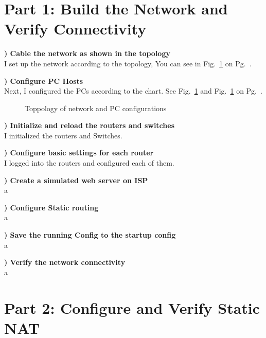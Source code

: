 \documentclass{report}
\title{\classinfo}
\author{\semester}
\date{\today}
\newcommand{\mysection}[1]{\section*{#1}}
\newcommand{\mysubsection}[2]{\textbf{\romannumeral #1) #2}}
\begin{document}
\maketitle

\mysection{\textbf{Part 1: Build the Network and Verify Connectivity}}

\mysubsection{1}{Cable the network as shown in the topology}\\
I set up the network according to the topology, You can see in
Fig.~\ref{P1Top20} on Pg.~\pageref{P1Top20}. 


\noindent\mysubsection{2}{Configure PC Hosts}\\
Next, I configured the PCs according to the chart. See
Fig.~\ref{P1Top20} and Fig.~\ref{P1Top20} on 
Pg.~\pageref{P1Top20}.


\begin{figure}[!hbt]\centering
{}\par
{}\hfill
{}\par
\caption{Toppology of network and PC configurations}
\label{P1Top20}
\end{figure}

\noindent\mysubsection{3}{Initialize and reload the routers and switches}\\
I initialized the routers and Switches.

\noindent\mysubsection{4}{Configure basic settings for each router}\\
I logged into the routers and configured each of them.

\noindent\mysubsection{5}{Create a simulated web server on ISP}\\
a

\noindent\mysubsection{6}{Configure Static routing}\\
a

\noindent\mysubsection{7}{Save the running Config to the startup config}\\
a

\noindent\mysubsection{8}{Verify the network connectivity}\\
a




\mysection{\textbf{Part 2: Configure and Verify Static NAT}}
\end{document}
